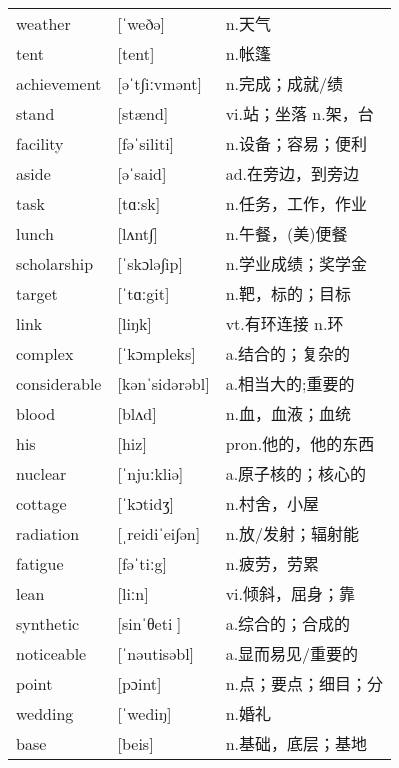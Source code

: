 \documentclass[a4paper]{article}
\begin{document}
\section{}
\begin{tabular}{l l l}

weather & [ˈweðə] & n.天气 \\
tent & [tent] & n.帐篷 \\
achievement & [əˈt∫iːvmənt] & n.完成；成就/绩 \\
stand & [stænd] & vi.站；坐落 n.架，台 \\
facility & [fəˈsiliti] & n.设备；容易；便利 \\
aside & [əˈsaid] & ad.在旁边，到旁边 \\
task & [tɑːsk] & n.任务，工作，作业 \\
lunch & [lʌnt∫] & n.午餐，(美)便餐 \\
scholarship & [ˈskɔlə∫ip] & n.学业成绩；奖学金 \\
target & [ˈtɑːgit] & n.靶，标的；目标 \\
link & [liŋk] & vt.有环连接 n.环 \\
complex & [ˈkɔmpleks] & a.结合的；复杂的 \\
considerable & [kənˈsidərəbl] & a.相当大的;重要的 \\
blood & [blʌd] & n.血，血液；血统 \\
his & [hiz] & pron.他的，他的东西 \\
nuclear & [ˈnjuːkliə] & a.原子核的；核心的 \\
cottage & [ˈkɔtidʒ] & n.村舍，小屋 \\
radiation & [ˌreidiˈei∫ən] & n.放/发射；辐射能 \\
fatigue & [fəˈtiːg] & n.疲劳，劳累 \\
lean & [liːn] & vi.倾斜，屈身；靠 \\
synthetic & [sinˈθeti] & a.综合的；合成的 \\
noticeable & [ˈnəutisəbl] & a.显而易见/重要的 \\
point & [pɔint] & n.点；要点；细目；分 \\
wedding & [ˈwediŋ] & n.婚礼 \\
base & [beis] & n.基础，底层；基地 \\

\end{tabular}
\end{document}
